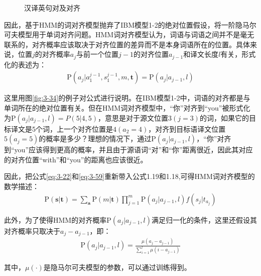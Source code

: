 \begin{figure}[htp]
    \centering

    \caption{汉译英句对及对齐}
    \label{fig:3-35}
\end{figure}

\parinterval 因此，基于HMM的词对齐模型抛弃了IBM模型1-2的绝对位置假设，将一阶隐马尔可夫模型用于单词对齐问题。HMM词对齐模型认为，词语与词语之间并不是毫无联系的，对齐概率应该取决于对齐位置的差异而不是本身词语所在的位置。具体来说，位置$j$的对齐概率$a_j$与前一个位置$j-1$的对齐位置$a_{j-1}$和译文长度$l$有关，形式化的表述为：
\begin{eqnarray}
\textrm{P}(a_{j}|a_{1}^{j-1},s_{1}^{j-1},m,\mathbf{t})=\textrm{P}(a_{j}|a_{j-1},l)
\label{eq:3-59}
\end{eqnarray}

\parinterval 这里用图\ref{fig:3-34}的例子对公式进行说明。在IBM模型1-2中，词语的对齐都是与单词所在的绝对位置有关。但在HMM词对齐模型中，``你''对齐到``you''被形式化为$\textrm{P}(a_{j}|a_{j-1},l)= P(5|4,5)$，意思是对于源文位置$3(j=3)$的词，如果它的目标译文是5个词，上一个对齐位置是$4(a_{2}=4)$，对齐到目标语译文位置$5(a_{j}=5)$的概率是多少？理想的情况下，通过$\textrm{P}(a_{j}|a_{j-1},l)$，``你''对齐到``you''应该得到更高的概率，并且由于源语词``对''和``你''距离很近，因此其对应的对齐位置``with''和``you''的距离也应该很近。

\parinterval 因此，把公式\ref{eq:3-22}和\ref{eq:3-59}重新带入公式1.19和1.18,可得HMM词对齐模型的数学描述：
\begin{eqnarray}
\textrm{P}(\mathbf{s}| \mathbf{t})=\sum_{\mathbf{a}}{\textrm{P}(m|\mathbf{t})}\prod_{j=1}^{m}{\textrm{P}(a_{j}|a_{j-1},l)f(s_{j}|t_{a_j})}
\label{eq:3-60}
\end{eqnarray}

\parinterval 此外，为了使得HMM的对齐概率$\textrm{P}(a_{j}|a_{j-1},l)$满足归一化的条件，这里还假设其对齐概率只取决于$a_{j}-a_{j-1}$，即：
\begin{eqnarray}
\textrm{P}(a_{j}|a_{j-1},l)=\frac{\mu(a_{j}-a_{j-1})}{\sum_{i=1}^{l}{\mu(i-a_{j-1})}}
\label{eq:3-61}
\end{eqnarray}

\noindent 其中，$\mu( \cdot )$是隐马尔可夫模型的参数，可以通过训练得到。


